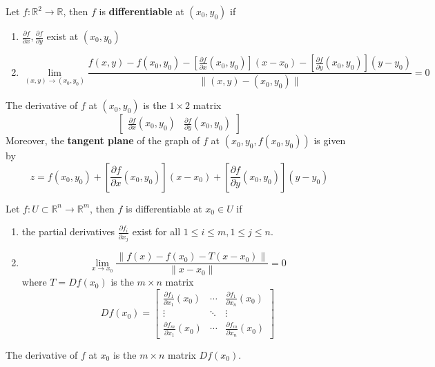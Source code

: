 \documentclass[openany]{book}
\newcommand{\R}{\mathbb{R}}
\begin{document}
\begin{defn}\label{tangent plane of graph}
    Let $f:\R^2\to\R$, then $f$ is \textbf{differentiable} at $(x_0,y_0)$ if 
    \begin{enumerate}
        \item[(1)] $\frac{\partial f}{\partial x},\frac{\partial f}{\partial y}$ exist at $(x_0,y_0)$
        \item[(2)] 
        \begin{equation*}
            \lim_{(x,y)\to(x_0,y_0)}\frac{f(x,y)-f(x_0,y_0)-\left[\frac{\partial f}{\partial x}(x_0,y_0)\right](x-x_0)-\left[\frac{\partial f}{\partial y}(x_0,y_0)\right](y-y_0)}{\|(x,y)-(x_0,y_0)\|}=0
        \end{equation*}
    \end{enumerate}
    The derivative of $f$ at $(x_0,y_0)$ is the $1\times 2$ matrix 
    \begin{equation*}
        \begin{bmatrix}\frac{\partial f}{\partial x}(x_0,y_0)&\frac{\partial f}{\partial y}(x_0,y_0)\end{bmatrix}
    \end{equation*}
    Moreover, the \textbf{tangent plane} of the graph of $f$ at $(x_0,y_0, f(x_0,y_0))$ is given by 
    \begin{equation*}
        z=f(x_0,y_0)+\left[\frac{\partial f}{\partial x}(x_0,y_0)\right](x-x_0)+\left[\frac{\partial f}{\partial y}(x_0,y_0)\right](y-y_0)
    \end{equation*}
\end{defn}

\begin{defn}
    Let $f:U\subset\R^n\to\R^m$, then $f$ is differentiable at $x_0\in U$ if
    \begin{enumerate}
        \item[(1)] the partial derivatives $\frac{\partial f_i}{\partial x_j}$ exist for all $1\leq i\leq m, 1\leq j\leq n$. 
        \item[(2)]
        \begin{equation*}
            \lim_{x\to x_0}\frac{\|f(x)-f(x_0)-T(x-x_0)\|}{\|x-x_0\|}=0
        \end{equation*}
        where $T=Df(x_0)$ is the $m\times n$ matrix 
        \begin{equation*}
            Df(x_0)=
            \begin{bmatrix}
            \frac{\partial f_1}{\partial x_1}(x_0) & \cdots & \frac{\partial f_1}{\partial x_n}(x_0) \\
            \vdots & \ddots & \vdots \\
            \frac{\partial f_m}{\partial x_1}(x_0) & \cdots & \frac{\partial f_m}{\partial x_n}(x_0)
            \end{bmatrix}
        \end{equation*}
    \end{enumerate}
    The derivative of $f$ at $x_0$ is the $m\times n$ matrix $Df(x_0)$.
\end{defn}
\end{document}

